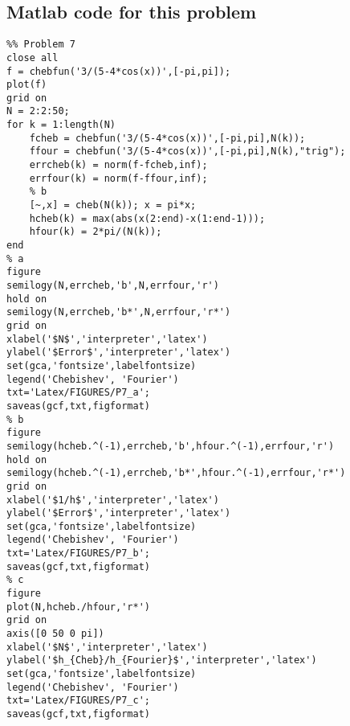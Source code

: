 \subsection*{Matlab code for this problem}
\begin{verbatim}
%% Problem 7
close all
f = chebfun('3/(5-4*cos(x))',[-pi,pi]);
plot(f)
grid on
N = 2:2:50;
for k = 1:length(N)
    fcheb = chebfun('3/(5-4*cos(x))',[-pi,pi],N(k));
    ffour = chebfun('3/(5-4*cos(x))',[-pi,pi],N(k),"trig");
    errcheb(k) = norm(f-fcheb,inf);
    errfour(k) = norm(f-ffour,inf);
    % b
    [~,x] = cheb(N(k)); x = pi*x;
    hcheb(k) = max(abs(x(2:end)-x(1:end-1)));
    hfour(k) = 2*pi/(N(k));
end
% a
figure
semilogy(N,errcheb,'b',N,errfour,'r')
hold on
semilogy(N,errcheb,'b*',N,errfour,'r*')
grid on
xlabel('$N$','interpreter','latex')
ylabel('$Error$','interpreter','latex')
set(gca,'fontsize',labelfontsize)
legend('Chebishev', 'Fourier')
txt='Latex/FIGURES/P7_a';
saveas(gcf,txt,figformat)
% b
figure
semilogy(hcheb.^(-1),errcheb,'b',hfour.^(-1),errfour,'r')
hold on
semilogy(hcheb.^(-1),errcheb,'b*',hfour.^(-1),errfour,'r*')
grid on
xlabel('$1/h$','interpreter','latex')
ylabel('$Error$','interpreter','latex')
set(gca,'fontsize',labelfontsize)
legend('Chebishev', 'Fourier')
txt='Latex/FIGURES/P7_b';
saveas(gcf,txt,figformat)
% c
figure
plot(N,hcheb./hfour,'r*')
grid on
axis([0 50 0 pi])
xlabel('$N$','interpreter','latex')
ylabel('$h_{Cheb}/h_{Fourier}$','interpreter','latex')
set(gca,'fontsize',labelfontsize)
legend('Chebishev', 'Fourier')
txt='Latex/FIGURES/P7_c';
saveas(gcf,txt,figformat)
\end{verbatim}